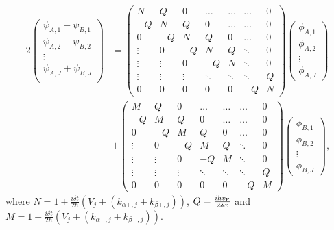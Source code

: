 \begin{align}
    \label{eq:temporaryEquation}
    2\begin{pmatrix}
         \psi_{A,1} + \psi_{B,1} \\
         \psi_{A,2} + \psi_{B,2} \\
         \vdots                  \\
         \psi_{A,J} + \psi_{B,J} \\
    \end{pmatrix} &=
    \begin{pmatrix}
        N      & Q      & 0      & \ldots & \ldots & \ldots & 0 \\
        -Q     & N      & Q      & 0      & \ldots & \ldots & 0 \\
        0      & -Q     & N      & Q      & 0      & \ldots & 0 \\
        \vdots & 0      & -Q     & N      & Q      & \ddots & 0 \\
        \vdots & \vdots & 0      & -Q     & N      & \ddots & 0 \\
        \vdots & \vdots & \vdots & \ddots & \ddots & \ddots & Q \\
        0      & 0      & 0      & 0      & 0      & -Q     & N
    \end{pmatrix}\begin{pmatrix}
                     \phi_{A,1} \\
                     \phi_{A,2} \\
                     \vdots     \\
                     \phi_{A,J}
    \end{pmatrix}\\
    &+\begin{pmatrix}
          M      & Q      & 0      & \ldots & \ldots & \ldots & 0 \\
          -Q     & M      & Q      & 0      & \ldots & \ldots & 0 \\
          0      & -Q     & M      & Q      & 0      & \ldots & 0 \\
          \vdots & 0      & -Q     & M      & Q      & \ddots & 0 \\
          \vdots & \vdots & 0      & -Q     & M      & \ddots & 0 \\
          \vdots & \vdots & \vdots & \ddots & \ddots & \ddots & Q \\
          0      & 0      & 0      & 0      & 0      & -Q     & M
    \end{pmatrix}\begin{pmatrix}
                     \phi_{B,1} \\
                     \phi_{B,2} \\
                     \vdots     \\
                     \phi_{B,J}
    \end{pmatrix},
\end{align}
\noindent where $N =1 + \frac{i\delta t}{2\hbar} \left( V_j + \left(k_{\alpha+,j}+k_{\beta+,j}\right)\right)$, $Q=\frac{i\hbar v_{\mbox{\tiny F}}}{2\delta x}$ and $M =1 + \frac{i\delta t}{2\hbar}\left( V_j + \left(k_{\alpha-,j}+k_{\beta-,j}\right)\right)$.

